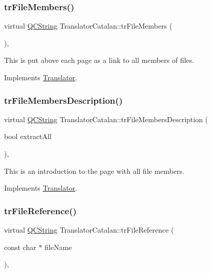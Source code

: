 \subsubsection{\texorpdfstring{trFileMembers()}{trFileMembers()}}
{\footnotesize\ttfamily virtual \mbox{\hyperlink{class_q_c_string}{Q\+C\+String}} Translator\+Catalan\+::tr\+File\+Members (\begin{DoxyParamCaption}{ }\end{DoxyParamCaption})\hspace{0.3cm}{\ttfamily [inline]}, {\ttfamily [virtual]}}

This is put above each page as a link to all members of files. 

Implements \mbox{\hyperlink{class_translator}{Translator}}.

\mbox{\label{class_translator_catalan_ac62e8f029d7834e381994ebb2949f124}} 
\subsubsection{\texorpdfstring{trFileMembersDescription()}{trFileMembersDescription()}}
{\footnotesize\ttfamily virtual \mbox{\hyperlink{class_q_c_string}{Q\+C\+String}} Translator\+Catalan\+::tr\+File\+Members\+Description (\begin{DoxyParamCaption}\item[{bool}]{extract\+All }\end{DoxyParamCaption})\hspace{0.3cm}{\ttfamily [inline]}, {\ttfamily [virtual]}}

This is an introduction to the page with all file members. 

Implements \mbox{\hyperlink{class_translator}{Translator}}.

\mbox{\label{class_translator_catalan_acfdea8d451cad40a19b6c693574f1528}} 
\subsubsection{\texorpdfstring{trFileReference()}{trFileReference()}}
{\footnotesize\ttfamily virtual \mbox{\hyperlink{class_q_c_string}{Q\+C\+String}} Translator\+Catalan\+::tr\+File\+Reference (\begin{DoxyParamCaption}\item[{const char $\ast$}]{file\+Name }\end{DoxyParamCaption})\hspace{0.3cm}{\ttfamily [inline]}, {\ttfamily [virtual]}}

